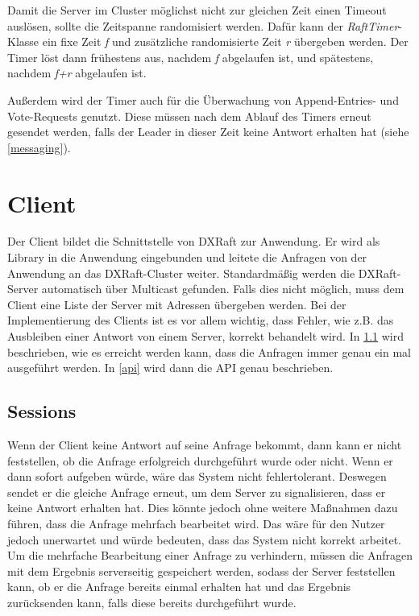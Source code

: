 Damit die Server im Cluster möglichst nicht zur gleichen Zeit einen Timeout auslösen, sollte die Zeitspanne randomisiert werden. Dafür kann der \textit{RaftTimer}-Klasse ein fixe Zeit \textit{f} und zusätzliche randomisierte Zeit \textit{r} übergeben werden. Der Timer löst dann frühestens aus, nachdem \textit{f} abgelaufen ist, und spätestens, nachdem \textit{f+r} abgelaufen ist.

Außerdem wird der Timer auch für die Überwachung von Append-Entries- und Vote-Requests genutzt. Diese müssen nach dem Ablauf des Timers erneut gesendet werden, falls der Leader in dieser Zeit keine Antwort erhalten hat (siehe \ref{messaging}).

\section{Client}

Der Client bildet die Schnittstelle von DXRaft zur Anwendung. Er wird als Library in die Anwendung eingebunden und leitete die Anfragen von der Anwendung an das DXRaft-Cluster weiter. Standardmäßig werden die DXRaft-Server automatisch über Multicast gefunden. Falls dies nicht möglich, muss dem Client eine Liste der Server mit Adressen übergeben werden. Bei der Implementierung des Clients ist es vor allem wichtig, dass Fehler, wie z.B. das Ausbleiben einer Antwort von einem Server, korrekt behandelt wird. In \ref{sessions} wird beschrieben, wie es erreicht werden kann, dass die Anfragen immer genau ein mal ausgeführt werden. In \ref{api} wird dann die API genau beschrieben.

\subsection{Sessions}
\label{sessions}

Wenn der Client keine Antwort auf seine Anfrage bekommt, dann kann er nicht feststellen, ob die Anfrage erfolgreich durchgeführt wurde oder nicht. Wenn er dann sofort aufgeben würde, wäre das System nicht fehlertolerant. Deswegen sendet er die gleiche Anfrage erneut, um dem Server zu signalisieren, dass er keine Antwort erhalten hat. Dies könnte jedoch ohne weitere Maßnahmen dazu führen, dass die Anfrage mehrfach bearbeitet wird. Das wäre für den Nutzer jedoch unerwartet und würde bedeuten, dass das System nicht korrekt arbeitet. Um die mehrfache Bearbeitung einer Anfrage zu verhindern, müssen die Anfragen mit dem Ergebnis serverseitig gespeichert werden, sodass der Server feststellen kann, ob er die Anfrage bereits einmal erhalten hat und das Ergebnis zurücksenden kann, falls diese bereits durchgeführt wurde.

